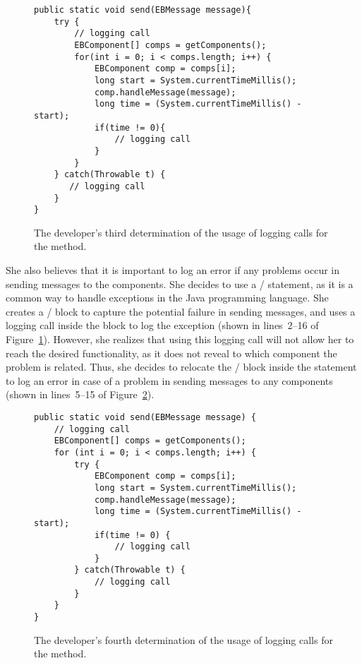 \begin{figure}[p]
\def\baselinestretch{1}
\begin{lstlisting}
public static void send(EBMessage message){
    try {
        // logging call
        EBComponent[] comps = getComponents();
        for(int i = 0; i < comps.length; i++) {
            EBComponent comp = comps[i];
            long start = System.currentTimeMillis();
            comp.handleMessage(message);
            long time = (System.currentTimeMillis() - start);
            if(time != 0){
                // logging call
            }
        }
    } catch(Throwable t) {
       // logging call
    }
}
\end{lstlisting}
\caption{The developer's third determination of the usage of logging calls for the  method.\label{ch2-ex-logged-m3}}
\end{figure}

She also believes that it is important to log an error if any problems occur in sending messages to the components. She decides to use a / statement, as it is a common way to handle exceptions in the Java programming language. She creates a / block to capture the potential failure in sending messages, and uses a logging call inside the  block to log the exception (shown in lines~2--16 of Figure~\ref{ch2-ex-logged-m3}). However, she realizes that using this logging call will not allow her to reach the desired functionality, as it does not reveal to which component the problem is related. Thus, she decides to relocate the / block inside the  statement to log an error in case of a problem in sending messages to any components (shown in lines~5--15 of Figure~\ref{ch2-ex-logged-m4}).


\begin{figure}[p]
\def\baselinestretch{1}
\begin{lstlisting}
public static void send(EBMessage message) {
    // logging call
    EBComponent[] comps = getComponents();
    for (int i = 0; i < comps.length; i++) {
        try {
            EBComponent comp = comps[i];
            long start = System.currentTimeMillis();
            comp.handleMessage(message);
            long time = (System.currentTimeMillis() - start);
            if(time != 0) {
                // logging call
            }
        } catch(Throwable t) {
            // logging call
        }
    }
}
\end{lstlisting}
\caption{The developer's fourth determination of the usage of logging calls for the  method.\label{ch2-ex-logged-m4}}
\end{figure}

